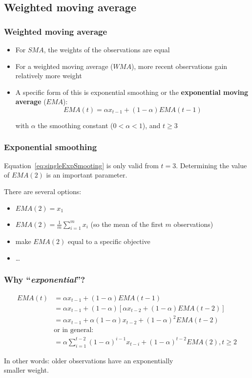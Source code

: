 \documentclass[aspectratio=169]{beamer}
\begin{document}
\subsection{Weighted moving average}

\begin{frame}
  \frametitle{Weighted moving average}
  
  \begin{itemize}
    \item For $SMA$, the weights of the observations are equal
    \item For a weighted moving average ($WMA$), more recent observations gain relatively more weight
    \item A specific form of this is exponential smoothing or the \textbf{exponential moving average} ($EMA$):
    \begin{equation}
    EMA(t) = \alpha x_{t-1} + (1-\alpha) EMA(t-1)
    \label{eq:singleExpSmooting}
    \end{equation}
    
    with $\alpha$ the smoothing constant ($0 < \alpha < 1$), and $t \geq 3$
  \end{itemize}
\end{frame}

\begin{frame}
  \frametitle{Exponential smoothing}
  
  Equation~\ref{eq:singleExpSmooting} is only valid from $t=3$. Determining the value of $EMA(2)$ is an important parameter.
  
  There are several options:
  
  \begin{itemize}
    \item $EMA(2) = x_1$
    \item $EMA(2) = \frac{1}{m} \sum_{i=1}^{m} x_i$ (so the mean of the first $m$ observations)
    \item make $EMA(2)$ equal to a specific objective
    \item \ldots
  \end{itemize}
\end{frame}

\begin{frame}
  \frametitle{Why ``\textit{exponential}''?}
  
  \begin{align*}
  EMA(t) &= \alpha x_{t-1} + (1-\alpha) EMA(t-1)                                           \\
  &= \alpha x_{t-1} + (1-\alpha)\left[\alpha x_{t-2} + (1-\alpha)EMA(t - 2)\right]  \\
  &= \alpha x_{t-1} + \alpha (1-\alpha)x_{t-2} + (1-\alpha)^{2} EMA(t - 2)          \\
  &  \text{or in general:} \\
  &= \alpha \sum_{i=1}^{t-2}(1-\alpha)^{i-1}x_{t-i} + (1-\alpha)^{t-2} EMA(2), t \geq 2
  \end{align*}
  
  In other words: older observations have an exponentially \\smaller weight.
\end{frame}
\end{document}
